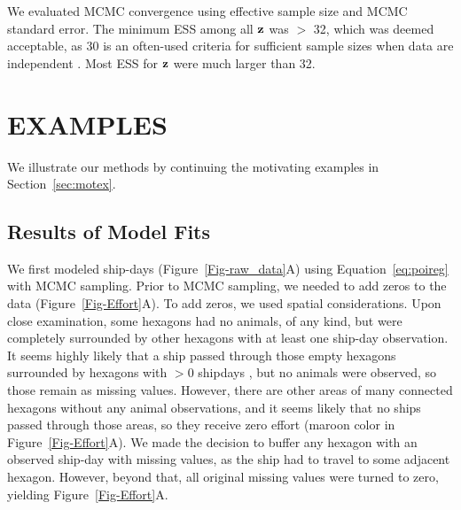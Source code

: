 \documentclass[11pt, titlepage]{article}
\begin{document}
\begin{spacing}{1.9}
\begin{flushleft}
We evaluated MCMC convergence using effective sample size \citep[ESS,][]{flegal_markov_2008, gong_practical_2016} and MCMC standard error.  The minimum ESS among all $\mathbf{z}$ was $>$ 32, which was deemed acceptable, as 30 is an often-used criteria for sufficient sample sizes when data are independent \citep[likely originating in][]{student_probable_1908}.  Most ESS for $\mathbf{z}$ were much larger than 32.


\section{EXAMPLES}

We illustrate our methods by continuing the motivating examples in Section~\ref{sec:motex}.


\subsection{Results of Model Fits}

We first modeled ship-days (Figure~\ref{Fig-raw_data}A) using Equation~\eqref{eq:poireg} with MCMC sampling.  Prior to MCMC sampling, we needed to add zeros to the data (Figure~\ref{Fig-Effort}A).  To add zeros, we used spatial considerations.  Upon close examination, some hexagons had no animals, of any kind, but were completely surrounded by other hexagons with at least one ship-day observation.  It seems highly likely that a ship passed through those empty hexagons surrounded by hexagons with $>0$ shipdays , but no animals were observed, so those remain as missing values.  However, there are other areas of many connected hexagons without any animal observations, and it seems likely that no ships passed through those areas, so they receive zero effort (maroon color in Figure~\ref{Fig-Effort}A). We made the decision to buffer any hexagon with an observed ship-day with missing values, as the ship had to travel to some adjacent hexagon.  However, beyond that, all original missing values were turned to zero, yielding Figure~\ref{Fig-Effort}A.


\end{flushleft}
\end{spacing}
\end{document}
